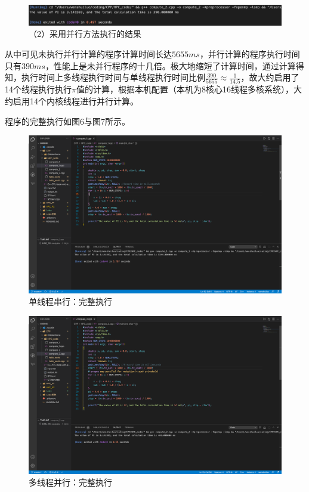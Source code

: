 \documentclass[12pt]{article}
\begin{document}
		\begin{figure}[htbp]
			\centering
			\includegraphics[width=1.0\textwidth]{result5.png}
			\caption{（2）采用并行方法执行的结果}
		\end{figure}

		从中可见未执行并行计算的程序计算时间长达$5655ms$，并行计算的程序执行时间只有$390ms$，性能上是未并行程序的十几倍。极大地缩短了计算时间，通过计算得知，执行时间上多线程执行时间与单线程执行时间比例$\frac{390}{5655}\approx \frac{1}{14.5}$，故大约启用了14个线程执行执行$\pi$值的计算，根据本机配置（本机为8核心16线程多核系统），大约启用14个内核线程进行并行计算。

		程序的完整执行如图6与图7所示。
		\begin{figure}[p]
			\centering
			\includegraphics[width=1.0\textwidth]{1_1.png}
			\caption{单线程串行：完整执行}
		\end{figure}

		\begin{figure}
			\centering
			\includegraphics[width=1.0\textwidth]{1_2.png}
			\caption{多线程并行：完整执行}
		\end{figure}
	
\end{document}

